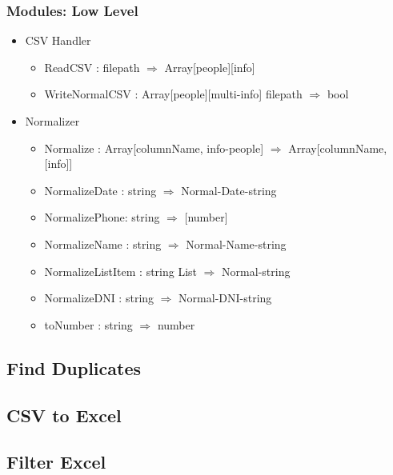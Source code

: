 \documentclass{article}
\begin{document}
\subsubsection{Modules: Low Level}
\begin{itemize}
\item CSV Handler
\begin{itemize}
\item ReadCSV : filepath $\Rightarrow$  Array[people][info]
\item WriteNormalCSV : Array[people][multi-info] filepath $\Rightarrow$ bool
\end{itemize}
\item Normalizer
\begin{itemize}
\item Normalize : Array[columnName, info-people] $\Rightarrow$  Array[columnName,[info]]
\item NormalizeDate : string $\Rightarrow$ Normal-Date-string
\item NormalizePhone: string $\Rightarrow$ [number]
\item NormalizeName : string $\Rightarrow$ Normal-Name-string
\item NormalizeListItem : string List $\Rightarrow$ Normal-string
\item NormalizeDNI  : string $\Rightarrow$ Normal-DNI-string
\item toNumber      : string $\Rightarrow$ number
\end{itemize}
\end{itemize}

\subsection{Find Duplicates}

\subsection{CSV to Excel}

\subsection{Filter Excel}
\end{document}
